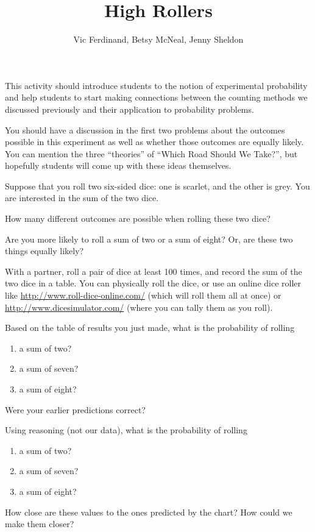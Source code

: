 \documentclass{ximera}
\title{High Rollers}
\author{Vic Ferdinand, Betsy McNeal, Jenny Sheldon}
\begin{document}
\begin{abstract}
\end{abstract}
\maketitle

\begin{instructorIntro}
This activity should introduce students to the notion of experimental probability and help students to start making connections between the counting methods we discussed previously and their application to probability problems.

You should have a discussion in the first two problems about the outcomes possible in this experiment as well as whether those outcomes are equally likely.  You can mention the three ``theories'' of ``Which Road Should We Take?'', but hopefully students will come up with these ideas themselves.
\end{instructorIntro}

Suppose that you roll two six-sided dice: one is scarlet, and the other is grey.  You are interested in the sum of the two dice.

\begin{problem}
How many different outcomes are possible when rolling these two dice?
\end{problem}

\begin{problem} 
Are you more likely to roll a sum of two or a sum of eight?  Or, are these two things equally likely?
\end{problem}

With a partner, roll a pair of dice at least 100 times, and record the sum of the two dice in a table.  You can physically roll the dice, or use an online dice roller like \url{http://www.roll-dice-online.com/} (which will roll them all at once) or \url{http://www.dicesimulator.com/} (where you can tally them as you roll).


\begin{problem}
Based on the table of results you just made, what is the probability of rolling
\begin{enumerate}
\item a sum of two?
\item a sum of seven?
\item a sum of eight?
\end{enumerate}
Were your earlier predictions correct?
\end{problem}

\begin{problem}
Using reasoning (not our data), what is the probability of rolling
\begin{enumerate}
\item a sum of two?
\item a sum of seven?
\item a sum of eight?
\end{enumerate}
How close are these values to the ones predicted by the chart?  How could we make them closer?
\end{problem}
\end{document}
